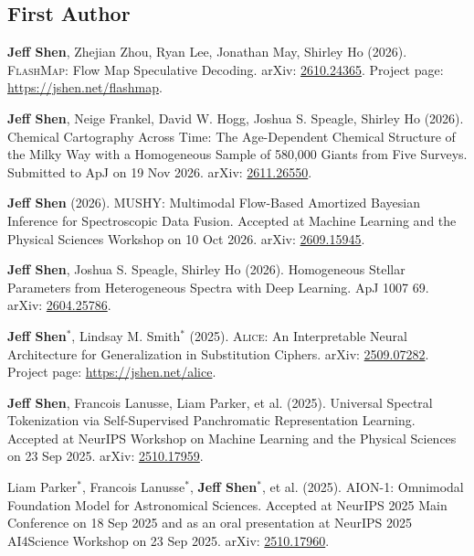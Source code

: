 \documentclass[10pt]{extarticle}
\begin{document}

\subsection*{First Author}

\begin{etaremune}
\item \textbf{Jeff Shen}, Zhejian Zhou, Ryan Lee, Jonathan May, Shirley Ho (2026). \textsc{FlashMap}: Flow Map Speculative Decoding. arXiv: \href{https://arxiv.org/abs/2610.24365}{2610.24365}. Project page: \url{https://jshen.net/flashmap}.
\item \textbf{Jeff Shen}, Neige Frankel, David W. Hogg, Joshua S. Speagle, Shirley Ho (2026). Chemical Cartography Across Time: The Age-Dependent Chemical Structure of the Milky Way with a Homogeneous Sample of 580,000 Giants from Five Surveys. Submitted to ApJ on 19 Nov 2026. arXiv: \href{https://arxiv.org/abs/2611.26550}{2611.26550}.
\item \textbf{Jeff Shen} (2026). MUSHY: Multimodal Flow-Based Amortized Bayesian Inference for Spectroscopic Data Fusion. Accepted at Machine Learning and the Physical Sciences Workshop on 10 Oct 2026. arXiv: \href{https://arxiv.org/abs/2609.15945}{2609.15945}.
\item \textbf{Jeff Shen}, Joshua S. Speagle, Shirley Ho (2026). Homogeneous Stellar Parameters from Heterogeneous Spectra with Deep Learning. ApJ 1007 69. arXiv: \href{https://arxiv.org/abs/2604.25786}{2604.25786}.
\item \textbf{Jeff Shen}$^\ast$, Lindsay M. Smith$^\ast$ (2025). \textsc{Alice}: An Interpretable Neural Architecture for Generalization in Substitution Ciphers. arXiv: \href{https://arxiv.org/abs/2509.07282}{2509.07282}. Project page: \url{https://jshen.net/alice}.
\item \textbf{Jeff Shen}, Francois Lanusse, Liam Parker, et al. (2025). Universal Spectral Tokenization via Self-Supervised Panchromatic Representation Learning. Accepted at NeurIPS Workshop on Machine Learning and the Physical Sciences on 23 Sep 2025. arXiv: \href{https://arxiv.org/abs/2510.17959}{2510.17959}.
\item Liam Parker$^\ast$, Francois Lanusse$^\ast$, \textbf{Jeff Shen}$^\ast$, et al. (2025). AION-1: Omnimodal Foundation Model for Astronomical Sciences. Accepted at NeurIPS 2025 Main Conference on 18 Sep 2025 and as an oral presentation at NeurIPS 2025 AI4Science Workshop on 23 Sep 2025. arXiv: \href{https://arxiv.org/abs/2510.17960}{2510.17960}.

\end{etaremune}
\end{document}
